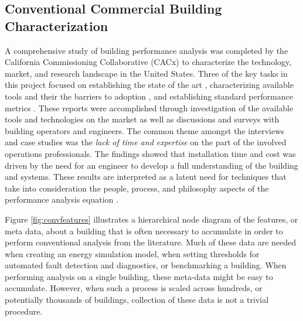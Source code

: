 \subsection{Conventional Commercial Building Characterization}
A comprehensive study of building performance analysis was completed by the California Commissioning Collaborative (CACx) to characterize the technology, market, and research landscape in the United States. Three of the key tasks in this project focused on establishing the state of the art \cite{effinger_building_2010}, characterizing available tools and their the barriers to adoption \cite{ulickey_building_2010}, and establishing standard performance metrics \cite{greensfelder_building_2010}. These reports were accomplished through investigation of the available tools and technologies on the market as well as discussions and surveys with building operators and engineers. The common theme amongst the interviews and case studies was the \emph{lack of time and expertise} on the part of the involved operations professionals. The findings showed that installation time and cost was driven by the need for an engineer to develop a full understanding of the building and systems. These results are interpreted as a latent need for techniques that take into consideration the people, process, and philosophy aspects of the performance analysis equation \cite{miller_applicability_2013}. 

Figure \ref{fig:convfeatures} illustrates a hierarchical node diagram of the features, or meta data, about a building that is often necessary to accumulate in order to perform conventional analysis from the literature. Much of these data are needed when creating an energy simulation model, when setting thresholds for automated fault detection and diagnostics, or benchmarking a building. When performing analysis on a single building, these meta-data might be easy to accumulate. However, when such a process is scaled across hundreds, or potentially thousands of buildings, collection of these data is not a trivial procedure. 

